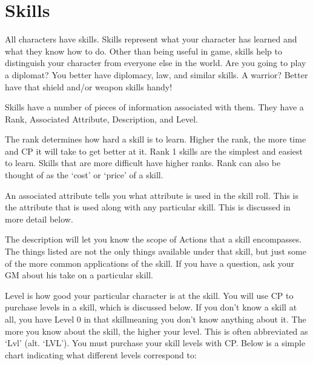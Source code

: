 \documentclass[twoside]{book}
\begin{document}
    

\section{Skills}
    
    {  
    All characters have skills. Skills represent what your
             character has learned and what they know how to do. Other
             than being useful in game, skills help to distinguish your
             character from everyone else in the world. Are you going to
             play a diplomat? You better have diplomacy, law, and similar
             skills. A warrior? Better have that shield and/or weapon
             skills handy! 
    }
  
    {  
    Skills have a number of pieces of information
             associated with them. They have a Rank, Associated
             Attribute, Description, and Level. 
    }
  
    {  
    The rank determines how hard a skill is to learn.
             Higher the rank, the more time and CP it will take to get
             better at it. Rank 1 skills are the simplest and easiest to
             learn. Skills that are more difficult have higher ranks.
             Rank can also be thought of as the `cost' or
             `price' of a skill. 
    }
  
    {  
    An associated attribute tells you what attribute is
             used in the skill roll. This is the attribute that is used
             along with any particular skill. This is discussed in more
             detail below. 
    }
  
    {  
    The description will let you know the scope of Actions
             that a skill encompasses. The things listed are not the only
             things available under that skill, but just some of the more
             common applications of the skill. If you have a question,
             ask your GM about his take on a particular skill. 
    }
  
    {  
    Level is how good your particular character is at the
             skill. You will use CP to purchase levels in a skill, which
             is discussed below. If you don't know a skill at all,
             you have Level 0 in that skillmeaning you don't
             know anything about it. The more you know about the skill,
             the higher your level. This is often abbreviated as
             `Lvl' (alt. `LVL'). You must
             purchase your skill levels with CP. Below is a simple chart
             indicating what different levels correspond to: 
    }
  
\end{document}
